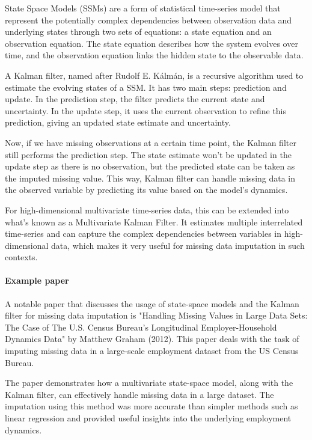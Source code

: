 \documentclass[a4paper,12pt,twoside,openright]{report}
\begin{document}
State Space Models (SSMs) are a form of statistical time-series model that represent the potentially complex dependencies between observation data and underlying states through two sets of equations: a state equation and an observation equation. The state equation describes how the system evolves over time, and the observation equation links the hidden state to the observable data.

A Kalman filter, named after Rudolf E. Kálmán, is a recursive algorithm used to estimate the evolving states of a SSM. It has two main steps: prediction and update. In the prediction step, the filter predicts the current state and uncertainty. In the update step, it uses the current observation to refine this prediction, giving an updated state estimate and uncertainty.

Now, if we have missing observations at a certain time point, the Kalman filter still performs the prediction step. The state estimate won't be updated in the update step as there is no observation, but the predicted state can be taken as the imputed missing value. This way, Kalman filter can handle missing data in the observed variable by predicting its value based on the model's dynamics.

For high-dimensional multivariate time-series data, this can be extended into what's known as a Multivariate Kalman Filter. It estimates multiple interrelated time-series and can capture the complex dependencies between variables in high-dimensional data, which makes it very useful for missing data imputation in such contexts.

\paragraph{Example paper} A notable paper that discusses the usage of state-space models and the Kalman filter for missing data imputation is "Handling Missing Values in Large Data Sets: The Case of The U.S. Census Bureau's Longitudinal Employer-Household Dynamics Data" by Matthew Graham (2012). This paper deals with the task of imputing missing data in a large-scale employment dataset from the US Census Bureau.

The paper demonstrates how a multivariate state-space model, along with the Kalman filter, can effectively handle missing data in a large dataset. The imputation using this method was more accurate than simpler methods such as linear regression and provided useful insights into the underlying employment dynamics.
\end{document}
